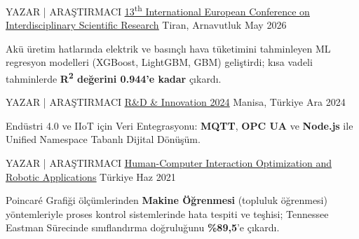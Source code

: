 \vspace{-2mm}


\begin{cventries}

  \cventry
    {YAZAR | ARAŞTIRMACI} %
    {\underline{\href{https://www.eucongress.org/_files/ugd/8f4327_0625909f99ad4ff7ac587a9a1fd87003.pdf}{13\textsuperscript{th} International European Conference on Interdisciplinary Scientific Research}}} %
    {Tiran, Arnavutluk} %
    {May 2026} %
    {
      \begin{cvitems} %
        \item {Akü üretim hatlarında elektrik ve basınçlı hava tüketimini tahminleyen ML regresyon modelleri (XGBoost, LightGBM, GBM) geliştirdi; kısa vadeli tahminlerde \textbf{R\textsuperscript{2} değerini 0.944'e kadar} çıkardı.}
      \end{cvitems}
    }

  \cventry
    {YAZAR | ARAŞTIRMACI} %
{\underline{\href{https://argeinv.mcbu.edu.tr/kongrelerimiz/altinci/ozet/ozet.pdf}{R\&D \& Innovation 2024}}} %
    {Manisa, Türkiye} %
    {Ara 2024} %
    {
      \begin{cvitems} %
        \item {Endüstri 4.0 ve IIoT için Veri Entegrasyonu: \textbf{MQTT}, \textbf{OPC UA} ve \textbf{Node.js} ile Unified Namespace Tabanlı Dijital Dönüşüm.}
      \end{cvitems}
    }

  \cventry
    {YAZAR | ARAŞTIRMACI} %
{\underline{\href{https://doi.org/10.31590/ejosat.952761}{Human-Computer Interaction Optimization and Robotic Applications}}} %
    {Türkiye} %
    {Haz 2021} %
    {
      \begin{cvitems} %
        \item {Poincaré Grafiği ölçümlerinden \textbf{Makine Öğrenmesi} (topluluk öğrenmesi) yöntemleriyle proses kontrol sistemlerinde hata tespiti ve teşhisi; Tennessee Eastman Sürecinde sınıflandırma doğruluğunu \textbf{\%89,5}'e çıkardı.}
      \end{cvitems}
    }


\end{cventries}
